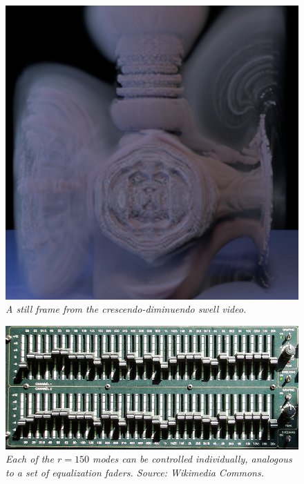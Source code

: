 \begin{figure}[H]
	\centering
	\includegraphics[width=\textwidth]{chap6/figures/swell.png}
	\caption{\em A still frame from the crescendo-diminuendo swell video.}
\label{fig:swell}
\end{figure}

\begin{figure}[H]
	\centering
	\includegraphics[width=\textwidth]{chap6/figures/faders.jpg}
	\caption{\em Each of the $r = 150$ modes can be controlled individually, analogous to a set of equalization faders. Source: Wikimedia Commons.}
\label{fig:faders}
\end{figure}

